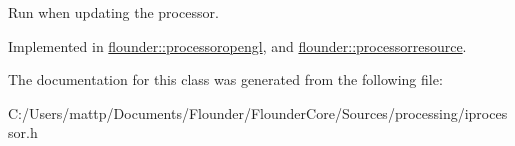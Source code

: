 Run when updating the processor. 



Implemented in \hyperlink{classflounder_1_1processoropengl_ad3ca7ada749d785e44fa2b536839f684}{flounder\+::processoropengl}, and \hyperlink{classflounder_1_1processorresource_afaeb27a9673c1f9b4366b537b7c0d377}{flounder\+::processorresource}.



The documentation for this class was generated from the following file\+:\begin{DoxyCompactItemize}
\item 
C\+:/\+Users/mattp/\+Documents/\+Flounder/\+Flounder\+Core/\+Sources/processing/iprocessor.\+h\end{DoxyCompactItemize}
